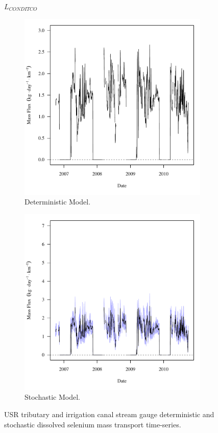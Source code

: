 \subfiguremid
\begin{landscape}
	\begin{figure}
		$ \displaystyle L_{CONDITCO} $
		\begin{subfigure}{0.7\textwidth}
			\centering
			\includegraphics[width=\tableCustomSize]{"Figures/Results_USR/Deterministic/f CON"}
			\caption{Deterministic Model.}
		\end{subfigure}%
		\begin{subfigure}{0.7\textwidth}
			\centering
			\includegraphics[width=\tableCustomSize]{"Figures/Results_USR/Stochastic/f CON"}
			\caption{Stochastic Model.}
		\end{subfigure}
		\caption{USR tributary and irrigation canal stream gauge deterministic and stochastic dissolved selenium mass transport time-series.}
	\end{figure}
\end{landscape}
